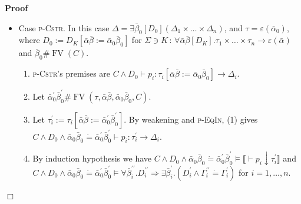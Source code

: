 \documentclass{article}
\newcommand{\assign}{:=}
\newcommand{\colons}{\,:\,}
\newcommand{\tmname}[1]{\textsc{#1}}
\newcommand{\tmop}[1]{\ensuremath{\operatorname{#1}}}
\newenvironment{proof}{\noindent\textbf{Proof\ }}{\hspace*{\fill}$\Box$\medskip}
\begin{document}
\begin{proof}
\begin{itemize}
\begin{enumerate}
      \item Assume w.l.o.g. $\bar{\beta}_1^{\prime} \#
      \bar{\beta}_2^{\prime}$, $\bar{\beta}_1^{\prime\prime} \#
      \bar{\beta}_2^{\prime\prime}$. Applying (1) for $i = 1, 2$ gives $C
      \vDash \forall \bar{\beta}_1^{\prime\prime} \bar{\beta}_2^{\prime\prime}
      .D_1^{\prime\prime} \wedge D_2^{\prime\prime} \Rightarrow \exists
      \bar{\beta}_1^{\prime} \bar{\beta}_2^{\prime} . (D_1^{\prime} \wedge
      D_2^{\prime} \wedge \Gamma_1^{\prime\prime} \dot{=} \Gamma_1^{\prime}
      \wedge \Gamma_2^{\prime\prime} \dot{=} \Gamma_2^{\prime})$, which
      completes the goal.
    \end{enumerate}
    \item Case {\tmname{p-Cstr}}. In this case $\Delta = \exists \bar{\beta}_0
    [D_0] (\Delta_1 \times \ldots \times \Delta_n)$, and $\tau = \varepsilon
    (\bar{\alpha}_0)$, where $D_0 \assign D_K [\bar{\alpha} \bar{\beta}
    \assign \bar{\alpha}_0 \bar{\beta}_0]$ for $\Sigma \ni K \colons \forall
    \bar{\alpha} \bar{\beta} [D_K] . \tau_1 \times \ldots \times \tau_n
    \rightarrow \varepsilon (\bar{\alpha})$ and $\bar{\beta}_0 \# \tmop{FV}
    (C)$.
    \begin{enumerate}
      \item {\tmname{p-Cstr}}'s premises are $C \wedge D_0 \vdash p_i : \tau_i
      [\bar{\alpha} \bar{\beta} \assign \bar{\alpha}_0 \bar{\beta}_0]
      \longrightarrow \Delta_i$.
      
      \item Let $\bar{\alpha}_0^{\prime} \bar{\beta}_0^{\prime} \# \tmop{FV}
      (\tau, \bar{\alpha} \bar{\beta}, \bar{\alpha}_0 \bar{\beta}_0, C)$.
      
      \item Let $\tau_i^{\prime} \assign \tau_i [\bar{\alpha} \bar{\beta}
      \assign \bar{\alpha}_0^{\prime} \bar{\beta}_0^{\prime}]$. By weakening
      and {\tmname{p-EqIn}}, (1) gives $C \wedge D_0 \wedge \bar{\alpha}_0
      \bar{\beta}_0 \dot{=} \bar{\alpha}_0^{\prime} \bar{\beta}_0^{\prime}
      \vdash p_i : \tau_i^{\prime} \longrightarrow \Delta_i$.
      
      \item By induction hypothesis we have $C \wedge D_0 \wedge
      \bar{\alpha}_0 \bar{\beta}_0 \dot{=} \bar{\alpha}_0^{\prime}
      \bar{\beta}_0^{\prime} \vDash \llbracket \vdash p_i \downarrow
      \tau_i^{\prime} \rrbracket$ and $C \wedge D_0 \wedge \bar{\alpha}_0
      \bar{\beta}_0 \dot{=} \bar{\alpha}_0^{\prime} \bar{\beta}_0^{\prime}
      \vDash \forall \bar{\beta}_i^{\prime\prime} .D_i^{\prime\prime}
      \Rightarrow \exists \bar{\beta}_i^{\prime} . (D_i^{\prime} \wedge
      \Gamma_i^{\prime\prime} \dot{=} \Gamma_i^{\prime})$ for $i = 1, \ldots,
      n$.
      

\end{enumerate}
\end{itemize}
\end{proof}
\end{document}
